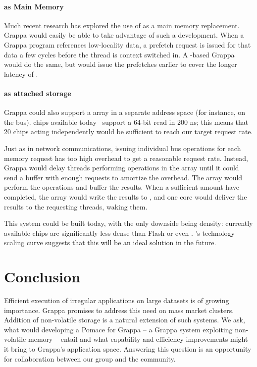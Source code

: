 \paragraph{ as Main Memory}
Much recent research has explored the use of  as a main memory
replacement. Grappa would easily be able to take advantage of such a
development. When a Grappa program references low-locality data,
a prefetch request is issued for that data a few cycles before the
thread is context switched in. A -based
Grappa would do the same, but would issue the prefetches earlier to
cover the longer latency of .

\paragraph{ as attached storage}

Grappa could also support a  array in a separate address space (for
instance, on the  bus).  chips available today~\cite{micronPCM} support a
64-bit read in 200 ns; this means that 20 chips acting independently
would be sufficient to reach our target request rate.

Just as in network communications, issuing individual  bus
operations for each memory request has too high overhead to get a
reasonable request rate.  Instead, Grappa would delay threads
performing operations in the  array until it could send a buffer
with enough requests to amortize the overhead. The  array would
perform the operations and buffer the results. When a sufficient
amount have completed, the  array would write the results to \@,
and one core would deliver the results to the requesting threads,
waking them.


This system could be built today, with the only downside being
density: currently available  chips are significantly less dense
than Flash or even \@. 's technology scaling curve suggests that
this will be an ideal solution in the future.

\section{Conclusion}
Efficient execution of irregular applications on large datasets is of
growing importance.  Grappa promises to address this need on mass
market clusters.  Addition of non-volatile storage is a natural
extension of such systems.  We ask, what would developing a Pomace for
Grappa -- a Grappa system exploiting non-volatile memory -- entail and
what capability and efficiency improvements might it bring to Grappa's
application space.  Answering this question is an opportunity for
collaboration between our group and the  community.











